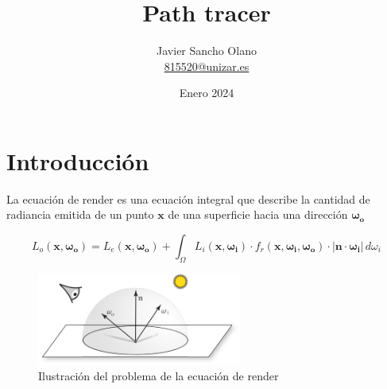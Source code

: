 \documentclass{article}
\title{Path tracer}
\author{Javier Sancho Olano \\ \href{mailto:815520@unizar.es}{815520@unizar.es}}
\date{Enero 2024}
\begin{document}
\maketitle

\tableofcontents
\newpage

\section{Introducción}
La ecuación de render es una ecuación integral que describe la cantidad de
radiancia emitida de un punto \(\mathbf{x}\) de una superficie hacia una
dirección \(\mathbf{\omega_{o}}\)

\begin{equation}
  L_o(\mathbf{x}, \mathbf{\omega_{o}}) = L_e(\mathbf{x}, \mathbf{\omega_{o}}) + \int_{\Omega} L_i(\mathbf{x}, \mathbf{\omega_{i}}) \cdot f_r(\mathbf{x}, \mathbf{\omega_{i}}, \mathbf{\omega_{o}}) \cdot  |\mathbf{n} \cdot \mathbf{\omega_{i}}| \, d\omega_{i}
\end{equation}

\begin{figure}[h]
  \centering \includegraphics[width=0.6\textwidth]{imgs/rendereq.png}
  \caption{Ilustración del problema de la ecuación de render}
\end{figure}
\end{document}
